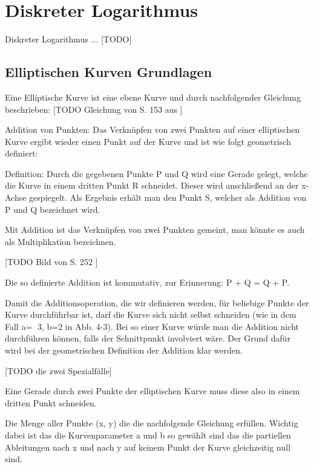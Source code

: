 \section{Diskreter Logarithmus}
	Diskreter Logarithmus ... [TODO]
	
	\subsection{Elliptischen Kurven Grundlagen}
	
		Eine Elliptische Kurve ist eine ebene Kurve und durch nachfolgender Gleichung beschrieben: [TODO Gleichung von S. 153 aus \cite{Kryptographie:und:IT-Sicherheit}] 
		
		
		Addition von Punkten: Das Verknüpfen von zwei Punkten auf einer elliptischen Kurve ergibt wieder einen Punkt auf der Kurve und ist wie folgt geometrisch definiert:
		 
		Definition: Durch die gegebenen Punkte P und Q wird eine Gerade gelegt, welche die Kurve in 
		einem dritten Punkt R schneidet. Dieser wird anschließend an der x-Achse 
		gespiegelt. Als Ergebnis erhält man den Punkt S, welcher als Addition von P und Q 
		bezeichnet wird. \cite{Information:und:Kommunikation}
		
		Mit Addition ist das Verknüpfen von zwei Punkten gemeint, man könnte es auch als Multiplikation bezeichnen.\cite{Information:und:Kommunikation}
		
		[TODO Bild von S. 252 \cite{Information:und:Kommunikation}]
		
		
		Die so definierte Addition ist kommutativ, zur Erinnerung: P + Q = Q + P.
		
				Damit die Additionsoperation, die wir definieren werden, für beliebige Punkte 
				der Kurve durchführbar ist, darf die Kurve sich nicht selbst schneiden (wie in dem Fall a= 3, 
				b=2 in Abb. 4-3). Bei so einer Kurve würde man die Addition nicht durchführen können, falls 
				der Schnittpunkt involviert wäre. Der Grund dafür wird bei der geometrischen Definition der 
				Addition  klar werden.\cite{Kryptographie:und:IT-Sicherheit}
		
		
		
		[TODO die zwei Spezialfälle]

		

		Eine  Gerade  durch  zwei  Punkte  der 
		elliptischen Kurve muss diese also in einem dritten Punkt schneiden. \cite{Information:und:Kommunikation}		
		
		
		Die Menge aller Punkte (x, y) die die nachfolgende Gleichung erfüllen. Wichtig dabei ist das die Kurvenparameter a und b so gewählt sind das die partiellen Ableitungen nach x und nach y auf keinem Punkt der Kurve gleichzeitig null sind.\cite{Information:und:Kommunikation}
		
